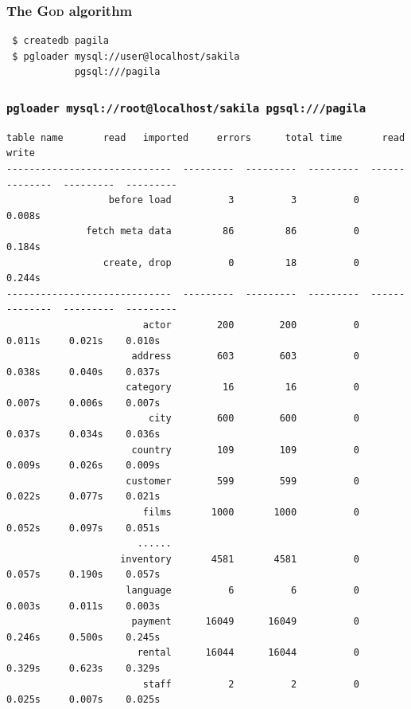 \documentclass{beamer}
\begin{document}
\begin{frame}[fragile]
  \frametitle{The \textsc{God} algorithm}

  \vfill

\begin{verbatim}
 $ createdb pagila
 $ pgloader mysql://user@localhost/sakila
            pgsql:///pagila
\end{verbatim}
\end{frame}

\begin{frame}[fragile]
  \frametitle{\small{\texttt{pgloader mysql://root@localhost/sakila pgsql:///pagila}}}

\begin{Verbatim}[fontsize=\tiny]
                   table name       read   imported     errors      total time       read      write
-----------------------------  ---------  ---------  ---------  --------------  ---------  ---------
                  before load          3          3          0          0.008s                     
              fetch meta data         86         86          0          0.184s                     
                 create, drop          0         18          0          0.244s                     
-----------------------------  ---------  ---------  ---------  --------------  ---------  ---------
                        actor        200        200          0          0.011s     0.021s    0.010s
                      address        603        603          0          0.038s     0.040s    0.037s
                     category         16         16          0          0.007s     0.006s    0.007s
                         city        600        600          0          0.037s     0.034s    0.036s
                      country        109        109          0          0.009s     0.026s    0.009s
                     customer        599        599          0          0.022s     0.077s    0.021s
                        films       1000       1000          0          0.052s     0.097s    0.051s
                       ......
                    inventory       4581       4581          0          0.057s     0.190s    0.057s
                     language          6          6          0          0.003s     0.011s    0.003s
                      payment      16049      16049          0          0.246s     0.500s    0.245s
                       rental      16044      16044          0          0.329s     0.623s    0.329s
                        staff          2          2          0          0.025s     0.007s    0.025s

\end{Verbatim}
\end{frame}
\end{document}
